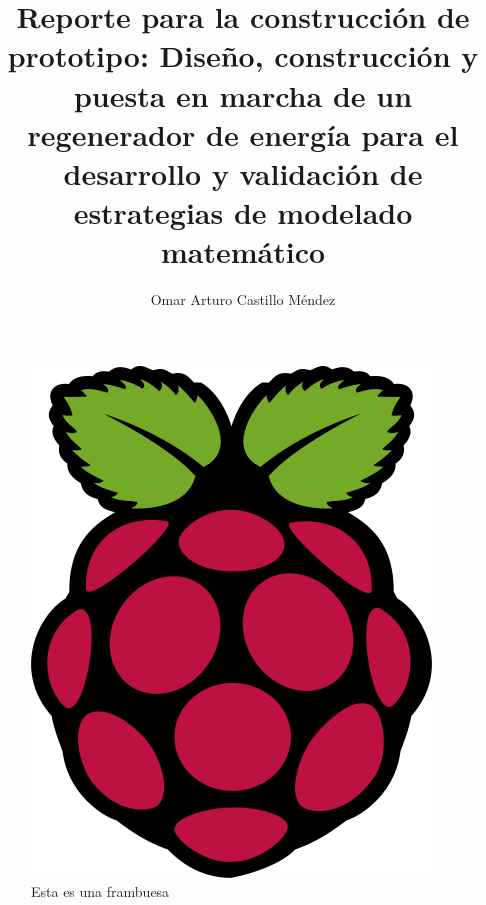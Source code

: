 \documentclass[spanish,12pt,letterpaper,final]{article}
\title{Reporte para la construcción de prototipo: Diseño, construcción y puesta en marcha de un regenerador de energía para el desarrollo y validación de estrategias de modelado matemático}
\author{Omar Arturo Castillo Méndez}
\begin{document}
	
	\begin{figure}
		\centering
		\includegraphics[scale=0.5]{rpi.png}
		\caption{Esta es una frambuesa}
	\end{figure}
\end{document}
